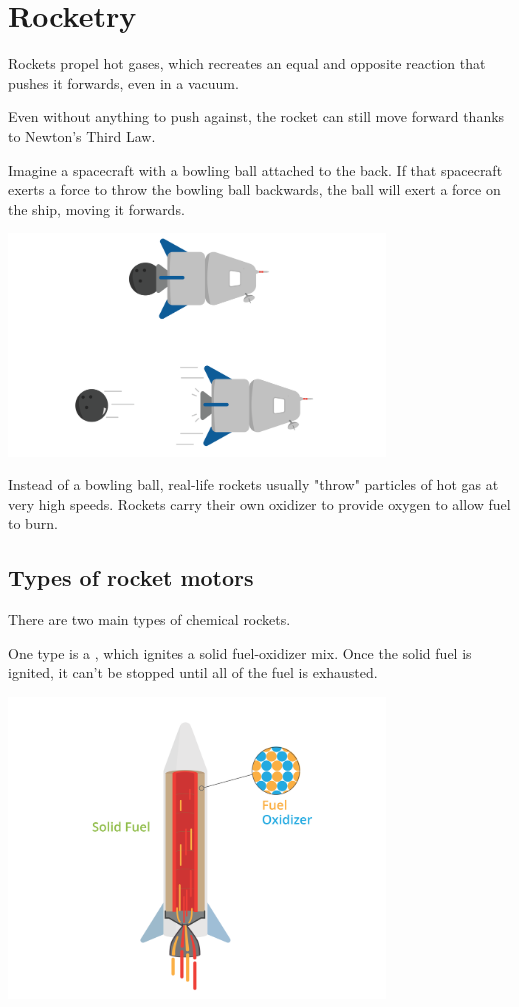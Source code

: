 \chapter{Rocketry}


Rockets propel hot gases, which recreates an equal and opposite reaction that pushes it forwards, even in a vacuum. 

Even without anything to push against, the rocket can still move forward thanks to Newton's Third Law. 

Imagine a spacecraft with a bowling ball attached to the back. If that spacecraft exerts a force to throw the bowling ball backwards, the ball will exert a force on the ship, moving it forwards. 


\includegraphics[width=0.75\textwidth]{thirdLaw.png}

Instead of a bowling ball, real-life rockets usually "throw" particles of hot gas at very high speeds. Rockets carry their own oxidizer to provide oxygen to allow fuel to burn. 

\section{Types of rocket motors}

There are two main types of chemical rockets. 

One type is a , which ignites a solid fuel-oxidizer mix. Once the solid fuel is ignited, it can't be stopped until all of the fuel is exhausted.


\includegraphics[width=0.75\textwidth]{solid.png}

